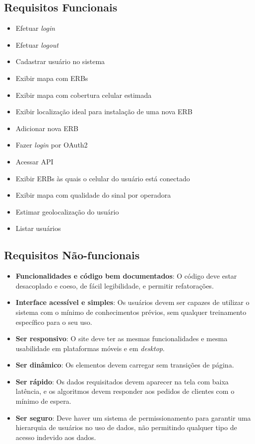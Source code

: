 \documentclass[]{politex}
\begin{document}
\subsection{Requisitos Funcionais}
\begin{itemize}
\item Efetuar \textit{login}
\item Efetuar \textit{logout}
\item Cadastrar usuário no sistema
\item Exibir mapa com ERBs
\item Exibir mapa com cobertura celular estimada
\item Exibir localização ideal para instalação de uma nova ERB
\item Adicionar nova ERB
\item Fazer \textit{login} por OAuth2
\item Acessar API
\item Exibir ERBs às quais o celular do usuário está conectado
\item Exibir mapa com qualidade do sinal por operadora
\item Estimar geolocalização do usuário
\item Listar usuários
\end{itemize}

\subsection{Requisitos Não-funcionais}
\begin{itemize}
\item \textbf{Funcionalidades e código bem documentados}: O código deve estar
desacoplado e coeso, de fácil legibilidade, e permitir refatorações.
\item \textbf{Interface acessível e simples}: Os usuários devem ser capazes de
utilizar o sistema com o mínimo de conhecimentos prévios, sem qualquer
treinamento específico para o seu uso.
\item \textbf{Ser responsivo}: O site deve ter as mesmas funcionalidades e mesma
usabilidade em plataformas móveis e em \textit{desktop}.
\item \textbf{Ser dinâmico}: Os elementos devem carregar sem transições de
página.
\item \textbf{Ser rápido}: Os dados requisitados devem aparecer na tela com
baixa latência, e os algoritmos devem responder aos pedidos de clientes com o
mínimo de espera.
\item \textbf{Ser seguro}: Deve haver um sistema de permissionamento para
garantir uma hierarquia de usuários no uso de dados, não permitindo qualquer
tipo de acesso indevido aos dados.
\end{itemize}
\end{document}

